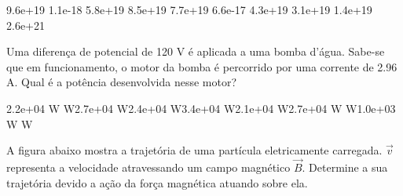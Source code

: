 \documentclass[12pt, addpoints]{exam}
\begin{document}
\begin{questions}
\begin{multicols*}{2}
\begin{oneparchoices}
\choice 9.6e+19 \choice 1.1e-18 \choice 5.8e+19 \choice 8.5e+19 \choice 7.7e+19 \choice 6.6e-17 \choice 4.3e+19 \choice 3.1e+19 \choice 1.4e+19 \choice 2.6e+21 
\end{oneparchoices}\question Uma diferença de potencial de 120 V é aplicada a uma bomba d’água. Sabe-se que em funcionamento, o motor da bomba é percorrido por uma corrente de    2.96 A. Qual é a potência desenvolvida nesse motor?

\begin{oneparchoices}
\choice 2.2e+04 W W\choice 2.7e+04 W\choice 2.4e+04 W\choice 3.4e+04 W\choice 2.1e+04 W\choice 2.7e+04 W W\choice 1.0e+03 W W
\end{oneparchoices}\question A ﬁgura abaixo mostra a trajetória de uma partícula eletricamente carregada. $\vec{{v}}$ representa a velocidade atravessando um campo magnético $\vec{{B}}$. Determine a sua trajetória devido a ação da força magnética atuando sobre ela.
        
        \begin{center}
            \begin{minipage}[c]{0.5\linewidth}
            \end{minipage}
        \end{center}

        


\end{multicols*}
\end{questions}
\end{document}
